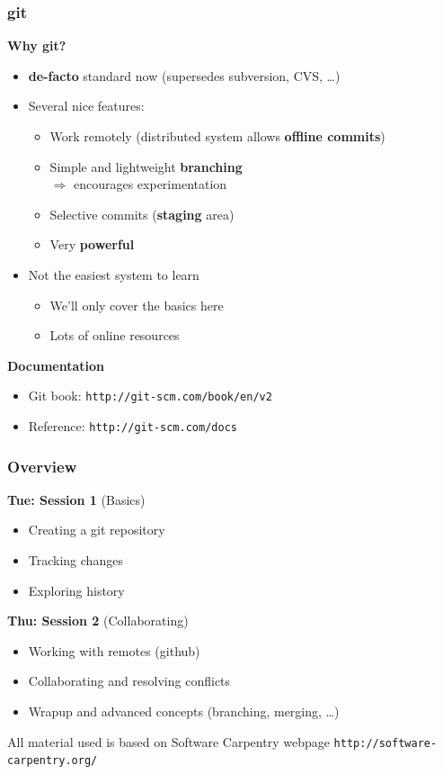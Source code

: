 \documentclass{beamer}
\begin{document}

\begin{frame}
  \frametitle{git}
  \textbf{\Large Why git?}
  \begin{itemize}
  \item \textbf{de-facto} standard now (supersedes subversion, CVS, \dots)
  \item Several nice features:
    \begin{itemize}
      \item Work remotely (distributed system allows \textbf{offline commits})
      \item Simple and lightweight \textbf{branching}\\$\Rightarrow$ encourages experimentation
      \item Selective commits (\textbf{staging} area)
      \item Very \textbf{powerful}
    \end{itemize}
  \item Not the easiest system to learn
    \begin{itemize}
      \item We'll only cover the basics here
      \item Lots of online resources
    \end{itemize}
  \end{itemize}
  \vspace{2ex}
  \textbf{\Large Documentation}
  \begin{itemize}
  \item Git book: \texttt{http://git-scm.com/book/en/v2}
  \item Reference: \texttt{http://git-scm.com/docs}
  \end{itemize}
\end{frame}


\begin{frame}
  \frametitle{Overview}
  \textbf{\Large Tue: Session 1} (Basics)
  \begin{itemize}
  \item Creating a git repository
  \item Tracking changes
  \item Exploring history
  \end{itemize}
  \vspace{2ex}
  \textbf{\Large Thu: Session 2} (Collaborating)
  \begin{itemize}
  \item Working with remotes (github)
  \item Collaborating and resolving conflicts
  \item Wrapup and advanced concepts (branching, merging, \dots)
  \end{itemize}
  \vspace{2ex}
  All material used is based on Software Carpentry webpage \texttt{http://software-carpentry.org/}
\end{frame}
\end{document}
